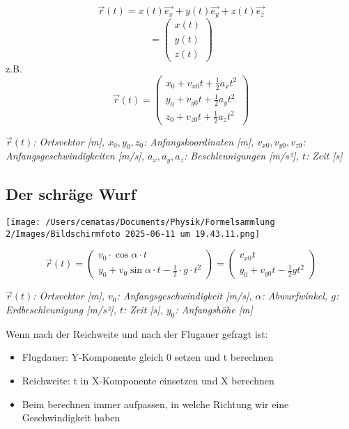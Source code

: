 \documentclass[a4paper,10pt]{article}
\newenvironment{displayformula}
{
	\begin{framed}
		\color{formulaColor}
	}
	{\end{framed}}
\newcommand{\formulalegend}[1]{%
	\par\vspace{0.5ex}%
	{{\color{legendColor}\RaggedRight\small\textit{#1}}}%
	\par\vspace{1.5ex}%
}
\begin{document}
\begin{displayformula}
	\[
	\vec{r}(t) = x(t)\vec{e_x} + y(t)\vec{e_y} + z(t)\vec{e_z}
	\]
	\[
	=
	\begin{pmatrix}
		x(t)\\
		y(t) \\
		z(t)
	\end{pmatrix}
	\]
	z.B.
	\[
	\vec{r}(t) = \begin{pmatrix}
		x_0 + v_{x0}t + \frac{1}{2}a_x t^2 \\
		y_0 + v_{y0}t + \frac{1}{2}a_y t^2 \\
		z_0 + v_{z0}t + \frac{1}{2}a_z t^2 
	\end{pmatrix}
	\]
\end{displayformula}
\formulalegend{
	\( \vec{r}(t) \): Ortsvektor [m], \( x_0, y_0, z_0 \): Anfangskoordinaten [m], \( v_{x0}, v_{y0}, v_{z0} \): Anfangsgeschwindigkeiten [m/s], \( a_x, a_y, a_z \): Beschleunigungen [m/s²], \( t \): Zeit [s]
}


\subsection{Der schräge Wurf}

\texttt{[image: /Users/cematas/Documents/Physik/Formelsammlung 2/Images/Bildschirmfoto 2025-06-11 um 19.43.11.png]}

\begin{displayformula}
	\[
	\vec{r}(t) =
	\begin{pmatrix}
		v_0 \cdot \cos\alpha \cdot t\\
		y_0 + v_0\sin\alpha \cdot t - \frac{1}{2} \cdot g \cdot t^2
	\end{pmatrix}
	=
	\begin{pmatrix}
		v_{x0} t\\
		y_0 + v_{y0} t - \frac{1}{2} g t^2
	\end{pmatrix}
	\]
\end{displayformula}
\formulalegend{
	\( \vec{r}(t) \): Ortsvektor [m], \( v_0 \): Anfangsgeschwindigkeit [m/s], \( \alpha \): Abwurfwinkel, \( g \): Erdbeschleunigung [m/s²], \( t \): Zeit [s], \( y_0 \): Anfangshöhe [m]
}
	Wenn nach der Reichweite und nach der Flugauer gefragt ist:
\begin{itemize}

	\item Flugdauer: Y-Komponente gleich 0 setzen und t berechnen
	\item Reichweite: t in X-Komponente einsetzen und X berechnen
	\item Beim berechnen immer aufpassen, in welche Richtung wir eine Geschwindigkeit haben
\end{itemize}
\end{document}
